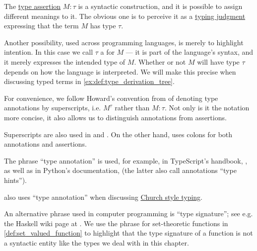 \begin{concept}\label{con:type_annotation}
  The \hyperref[def:type_assertion]{type assertion} \( M: \tau \) is a syntactic construction, and it is possible to assign different meanings to it. The obvious one is to perceive it as a \hyperref[rem:typing_judgments]{typing judgment} expressing that the term \( M \) has type \( \tau \).

  Another possibility, used across programming languages, is merely to highlight intention. In this case we call \( \tau \) a  for \( M \) --- it is part of the language's syntax, and it merely expresses the intended type of \( M \). Whether or not \( M \) will have type \( \tau \) depends on how the language is interpreted. We will make this precise when discussing typed terms in \cref{ex:def:type_derivation_tree}.

  For convenience, we follow Howard's convention from \cite{Howard1980FormulasAsTypes} of denoting type annotations by superscripts, i.e. \( M^\tau \) rather than \( M: \tau \). Not only is it the notation more concise, it also allows us to distinguish annotations from assertions.
\end{concept}
\begin{comments}
  \item Superscripts are also used in \cite{Mimram2020ProgramEqualsProof} and \cite[ch. 5]{Hindley1997BasicSTT}. On the other hand, \textcite{Barendregt1992LambdaCalculiWithTypes} uses colons for both annotations and assertions.

  \item The phrase \enquote{type annotation} is used, for example, in TypeScript's handbook, \cite{TypeScriptDocs:5.7:handbook}, as well as in Python's documentation, \cite{PythonDocs:3.13:typing} (the latter also call annotations \enquote{type hints}).

  \textcite[186]{Mimram2020ProgramEqualsProof} also uses \enquote{type annotation} when discussing \hyperref[rem:typing_style]{Church style typing}.

  An alternative phrase used in computer programming is \enquote{type signature}; see e.g. the Haskell wiki page at \cite{HaskellWiki:type_signature}. We use the phrase for set-theoretic functions in \cref{def:set_valued_function} to highlight that the type signature of a function is not a syntactic entity like the types we deal with in this chapter.
\end{comments}

